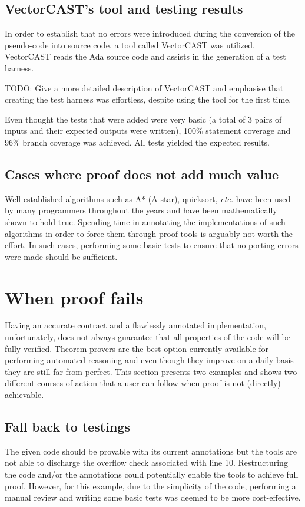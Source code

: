 \documentclass{llncs}
\newcommand{\etc}{\textit{etc.}\xspace}
\begin{document}
\subsection{VectorCAST's tool and testing results}
In order to establish that no errors were introduced during the conversion of the
pseudo-code into source code, a tool called VectorCAST was utilized. VectorCAST
reads the Ada source code and assists in the generation of a test harness.

TODO:  Give a more detailed description of VectorCAST and emphasise that creating the
test harness was effortless, despite using the tool for the first time.

Even thought the tests that were added were very basic (a total of 3 pairs
of inputs and their expected outputs were written), 100\% statement coverage and 96\%
branch coverage was achieved. All tests yielded the expected results.

\subsection{Cases where proof does not add much value}
Well-established algorithms such as A* (A star), quicksort, \etc have
been used by many programmers throughout the years and have been mathematically
shown to hold true. Spending time in annotating the implementations of such algorithms
in order to force them through proof tools is arguably not worth the effort. In such cases,
performing some basic tests to ensure that no porting errors were made should be sufficient.



\section{When proof fails}
Having an accurate contract and a flawlessly annotated implementation, unfortunately,
does not always guarantee that all properties of the code will be fully verified.
Theorem provers are the best option currently available for performing automated
reasoning and even though they improve on a daily basis they are still far from perfect.
This section presents two examples and shows two different courses of action
that a user can follow when proof is not (directly) achievable.

\subsection{Fall back to testings}


The given code should be provable with its current annotations but the tools are not
able to discharge the overflow check associated with line 10. Restructuring the code
and/or the annotations could potentially enable the tools to achieve full proof. However,
for this example, due to the simplicity of the code, performing a manual review and writing
some basic tests was deemed to be more cost-effective.
\end{document}
